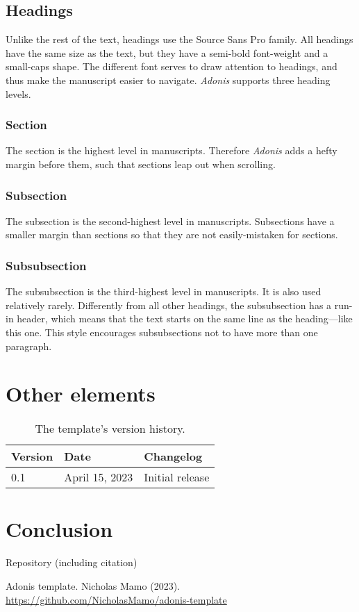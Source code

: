\documentclass{adonis}
\begin{document}
		\subsection{Headings}
		
			Unlike the rest of the text, headings use the Source Sans Pro family.
			All headings have the same size as the text, but they have a semi-bold font-weight and a small-caps shape.
			The different font serves to draw attention to headings, and thus make the manuscript easier to navigate.
			\textit{Adonis} supports three heading levels.
		
			\subsubsection{Section}
			
				The section is the highest level in manuscripts.
				Therefore \textit{Adonis} adds a hefty margin before them, such that sections leap out when scrolling.
			
			\subsubsection{Subsection}
			
				The subsection is the second-highest level in manuscripts.
				Subsections have a smaller margin than sections so that they are not easily-mistaken for sections.
			
			\subsubsection{Subsubsection}
			
				The subsubsection is the third-highest level in manuscripts.
				It is also used relatively rarely.
				Differently from all other headings, the subsubsection has a run-in header, which means that the text starts on the same line as the heading—like this one.
				This style encourages subsubsections not to have more than one paragraph.
			
	\section{Other elements}
	
		\begin{table*}[t!]
			\begin{tabularx}{\linewidth}{ l l X }
				\textbf{Version} & \textbf{Date} & \textbf{Changelog} \\ \hline
				0.1 & April 15, 2023 & Initial release \\
			\end{tabularx}
			\caption{The template's version history.}
			\label{table: version history}
		\end{table*}
	
	\section{Conclusion}
	
	
		Repository (including citation) \cite{repository}
		
	\begin{thebibliography}{9}
		Adonis template. Nicholas Mamo (2023). \url{https://github.com/NicholasMamo/adonis-template}
	\end{thebibliography}
	
\end{document}
